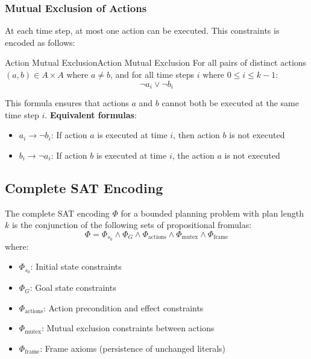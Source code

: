 \documentclass[a4paper]{article}
\theoremstyle{definition}
\begin{document}
\subsubsection{Mutual Exclusion of Actions}
At each time step, at most one action can be executed. This constraints is encoded as follows:
\begin{definition}{Action Mutual Exclusion}{Action Mutual Exclusion}
For all pairs of distinct actions $(a,b) \in A \times A$ where \( a \neq b \), and for all time steps \( i \) where \( 0 \leq i \leq k - 1 \):
\[
  \lnot a_i \vee \lnot b_i
\]
\end{definition}
This formula ensures that actions \( a \) and \( b \) cannot both be executed at the same time step \( i \).
\vspace{1em}
\noindent 
\newline
\textbf{Equivalent formulas}:
\begin{itemize}
    \item \( a_i \rightarrow \lnot b_i \): If action \( a \) is executed at time \( i \), then action \( b \) is not executed 
    \item \( b_i \rightarrow \lnot a_i \): If action \( b \) is executed at time \( i \), the action \( a \) is not executed
\end{itemize} 
\subsection{Complete SAT Encoding}
The complete SAT encoding \( \Phi \) for a bounded planning problem with plan length \( k \) is the conjunction of the following sets of propositional fromulas:
\[
  \Phi = \Phi_{s_0} \wedge \Phi_G \wedge \Phi_{\text{actions}} \wedge \Phi_{\text{mutex}} \wedge \Phi_{\text{frame}}
\]
where: 
\begin{itemize}
    \item \( \Phi_{s_0} \): Initial state constraints 
    \item \( \Phi_G \): Goal state constraints 
    \item \( \Phi_{\text{actions}} \): Action precondition and effect constraints 
    \item \( \Phi_{\text{mutex}} \): Mutual exclusion constraints between actions 
    \item \( \Phi_{\text{frame}} \): Frame axioms (persistence of unchanged literals)
\end{itemize}
\end{document}
